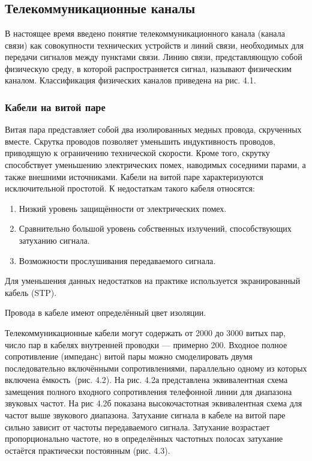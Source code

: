 \documentclass[
	a4paper,
	oneside,
	BCOR = 10mm,
	DIV = 12,
	12pt,
	headings = normal,
]{scrartcl}
\begin{document}
	\section{}
		\subsection{Телекоммуникационные каналы}
			В настоящее время введено понятие телекоммуникационного канала (канала связи) как совокупности технических устройств и линий связи, необходимых для передачи сигналов между пунктами связи. Линию связи, представляющую собой физическую среду, в которой распространяется сигнал, называют физическим каналом. Классификация физических каналов приведена на рис. 4.1.

			\subsubsection{Кабели на витой паре}
			
				Витая пара представляет собой два изолированных медных провода, скрученных вместе. Скрутка проводов позволяет уменьшить индуктивность проводов, приводящую к ограничению технической скорости. Кроме того, скрутку способствует уменьшению электрических помех, наводимых соседними парами, а также внешними источниками. Кабели на витой паре характеризуются исключительной простотой. К недостаткам такого кабеля относятся:
			\begin{enumerate}
				\item Низкий уровень защищённости от электрических помех.
				\item Сравнительно большой уровень собственных излучений, способствующих затуханию сигнала.
				\item Возможности прослушивания передаваемого сигнала.
			\end{enumerate}
			Для уменьшения данных недостатков на практике используется экранированный кабель (STP).

			Провода в кабеле имеют определённый цвет изоляции.

			Телекоммуникационные кабели могут содержать от 2000 до 3000 витых пар, число пар в кабелях внутренней проводки — примерно 200. Входное полное сопротивление (импеданс) витой пары можно смоделировать двумя последовательно включёнными сопротивлениями, параллельно одному из которых включена ёмкость~(рис. 4.2). На рис. 4.2а представлена эквивалентная схема замещения полного входного сопротивления телефонной линии для диапазона звуковых частот. На рис 4.2б показана высокочастотная эквивалентная схема для частот выше звукового диапазона. Затухание сигнала в кабеле на витой паре сильно зависит от частоты передаваемого сигнала. Затухание возрастает пропорционально частоте, но в определённых частотных полосах затухание остаётся практически постоянным (рис. 4.3).
\end{document}
